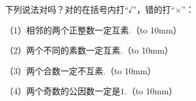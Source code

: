 下列说法对吗？对的在括号内打“√”，错的打“×”：

（1）相邻的两个正整数一定互素.（\hbox to 10mm{}）

（2）两个不同的素数一定互素.（\hbox to 10mm{}）

（3）两个合数一定不互素.（\hbox to 10mm{}）

（4）两个奇数的公因数一定是$1$.（\hbox to 10mm{}）